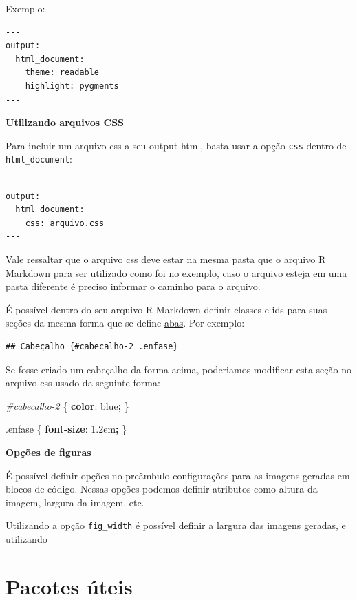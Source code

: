 \documentclass[
]{book}
\newenvironment{Shaded}{\begin{snugshade}}{\end{snugshade}}
\newcommand{\ConstantTok}[1]{\textcolor[rgb]{0.00,0.00,0.00}{#1}}
\newcommand{\DataTypeTok}[1]{\textcolor[rgb]{0.13,0.29,0.53}{#1}}
\newcommand{\DecValTok}[1]{\textcolor[rgb]{0.00,0.00,0.81}{#1}}
\newcommand{\FunctionTok}[1]{\textcolor[rgb]{0.00,0.00,0.00}{#1}}
\newcommand{\KeywordTok}[1]{\textcolor[rgb]{0.13,0.29,0.53}{\textbf{#1}}}
\newcommand{\NormalTok}[1]{#1}
\newcommand{\OperatorTok}[1]{\textcolor[rgb]{0.81,0.36,0.00}{\textbf{#1}}}
\newcommand{\PreprocessorTok}[1]{\textcolor[rgb]{0.56,0.35,0.01}{\textit{#1}}}
\begin{document}
Exemplo:

\begin{verbatim}
---
output:
  html_document:
    theme: readable
    highlight: pygments
---
\end{verbatim}

\textbf{Utilizando arquivos CSS}

Para incluir um arquivo css a seu output html, basta usar a opção \texttt{css} dentro de \texttt{html\_document}:

\begin{verbatim}
---
output:
  html_document:
    css: arquivo.css
---
\end{verbatim}

Vale ressaltar que o arquivo css deve estar na mesma pasta que o arquivo R Markdown para ser utilizado como foi no exemplo, caso o arquivo esteja em uma pasta diferente é preciso informar o caminho para o arquivo.

É possível dentro do seu arquivo R Markdown definir classes e ids para suas seções da mesma forma que se define \protect\hyperlink{abas}{abas}. Por exemplo:

\begin{verbatim}
## Cabeçalho {#cabecalho-2 .enfase}
\end{verbatim}

Se fosse criado um cabeçalho da forma acima, poderiamos modificar esta seção no arquivo css usado da seguinte forma:

\begin{Shaded}
\begin{Highlighting}[]
\PreprocessorTok{\#cabecalho{-}2}\NormalTok{ \{}
  \KeywordTok{color}\NormalTok{: }\ConstantTok{blue}\OperatorTok{;}
\NormalTok{\}}

\FunctionTok{.enfase}\NormalTok{ \{}
  \KeywordTok{font{-}size}\NormalTok{: }\DecValTok{1.2}\DataTypeTok{em}\OperatorTok{;}
\NormalTok{\}}
\end{Highlighting}
\end{Shaded}

\textbf{Opções de figuras}

É possível definir opções no preâmbulo configurações para as imagens geradas em blocos de código. Nessas opções podemos definir atributos como altura da imagem, largura da imagem, etc.

Utilizando a opção \texttt{fig\_width} é possível definir a largura das imagens geradas, e utilizando

\hypertarget{pacotes-uxfateis}{%
\section{Pacotes úteis}\label{pacotes-uxfateis}}
\end{document}

